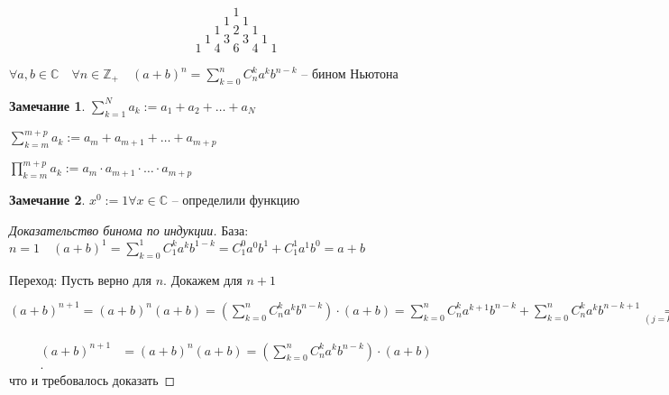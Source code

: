 \documentclass{book}
\newcommand\Z{\ensuremath{\mathbb{Z}}}
\renewcommand\C{\ensuremath{\mathbb{C}}}
\theoremstyle{definition}
\newtheorem*{note}{Замечание}
\begin{document}
       $$1$$ $$1\quad 1$$ $$1\quad 2\quad 1$$ $$1\quad 3\quad 3\quad 1$$ $$1\quad 4\quad 6\quad 4\quad 1$$

       \begin{statement}
           $\forall a, b\in \C\quad \forall n\in \Z _+\quad (a+b)^n = \sum_{k=0}^{n} C_n^ka^kb^{n-k}$ -- бином Ньютона
       \end{statement}

       \begin{note}
           $\sum_{k=1}^{N} a_k := a_1 + a_2 + \ldots + a_N$

           $\sum_{k=m}^{m+p} a_k := a_m + a_{m+1} + \ldots + a_{m+p}$

           $\prod_{k=m}^{m+p} a_k := a_m\cdot a_{m+1}\cdot \ldots\cdot a_{m+p} $
       \end{note}
        \begin{note}
            $x^0:=1 \forall x\in \C $ -- определили функцию
        \end{note}
       \begin{proof}
           [Доказательство бинома по индукции]
           База: $n=1\quad (a+b)^1 = \sum_{k=0}^{1} C_1^k a^kb^{1-k} = C_1^0 a^0b^1 + C_1^1a^1b^0 = a+b$

           Переход: Пусть верно для $n$. Докажем для $n+1$

           $(a+b)^{n+1} = (a+b)^n(a+b) = \left(\sum_{k=0}^{n} C_n^k a^k b^{n-k}\right) \cdot  (a+b) = \sum_{k=0}^{n} C_n^k a^{k+1}b^{n-k} + \sum_{k=0}^{n} C_n^ka^kb^{n-k+1} \underset{(j=k+1)} = \sum_{j=1}^{n+1} C_n^{j-1}a^jb^{n+1-j} + \sum_{k=0}^{n} C_n^k a^kb^{n+1-k} \underset{k=j}= \sum_{k=1}^{n+1} C_n^{k-1} a^k b^{n+1-k} + \sum_{k=0}^{n} C_n^ka^kb^{n+1-k}  = C_{n}^na^{n+1}b^0 + \sum_{k=1}^{n}\left( C_n^{k-1}a^kb^{n+1-k} + C_n^k a^kb^{n+1-k}\right) + C_n^0a^0b^{n+1} = C_{n+1}^{n+1}a^{n+1}b^0 + \sum_{k=1}^{n} C_{n+1}^k a^{n+1}b^{n+1-k} + C_{n+1}^0 a^0b^{n+1} = \sum_{k=0}^{n+1} C_{n+1}^ka^kb^{n+1-k}$

           \begin{align*}
               (a+b)^{n+1} &= (a+b)^n(a+b) = \left(\sum_{k=0}^{n} C_n^k a^k b^{n-k}\right) \cdot  (a+b)\\  
           .\end{align*}
           что и требовалось доказать
       \end{proof}
\end{document}
